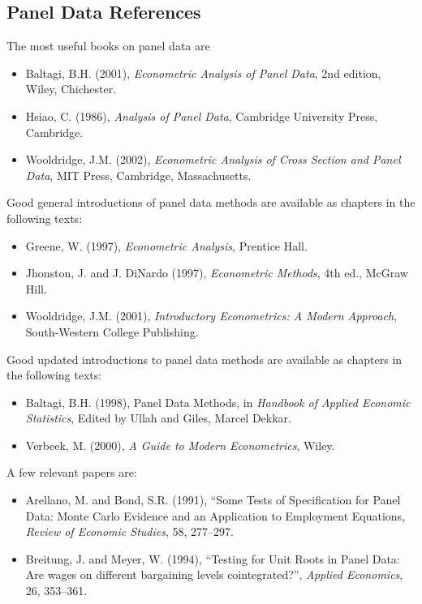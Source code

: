 \documentclass[landscape,letterpaper,9pt]{article}
\begin{document}
\begin{itemize}
\subsection
{Panel Data References}
The most useful books on panel data are

\begin{itemize}
\item Baltagi, B.H. (2001), \textit{Econometric Analysis of Panel Data}, 2nd edition,  Wiley,  Chichester.

\item  Hsiao, C. (1986), \textit{Analysis of Panel Data}, Cambridge University Press, Cambridge.

\item  Wooldridge, J.M. (2002), \textit{Econometric Analysis of Cross Section and Panel Data}, MIT Press, Cambridge, Massachusetts.
\end{itemize}
%
%
Good general  introductions of panel data methods  are available as chapters
in the following texts:
\begin{itemize}
\item  Greene, W. (1997), \textit{Econometric Analysis}, Prentice Hall.

\item  Jhonston, J. and J. DiNardo (1997), \textit{Econometric Methods}, 4th ed., McGraw Hill.

\item  Wooldridge, J.M. (2001), \textit{Introductory Econometrics: A Modern Approach}, South-Western College Publishing.
\end{itemize}

Good updated introductions to panel data methods  are available as chapters
in the following texts:
\begin{itemize}
\item Baltagi, B.H. (1998), Panel Data Methods, in \textit{Handbook of Applied Economic Statistics},
Edited by Ullah and Giles, Marcel Dekkar.
\item  Verbeek, M. (2000),  \textit{A Guide to Modern Econometrics}, Wiley.
\end{itemize}
%
A few relevant papers are:
\begin{itemize}
\item Arellano, M. and Bond, S.R. (1991), ``Some Tests of Specification for Panel Data:
Monte Carlo Evidence and an Application to Employment Equations, \textit{Review of Economic Studies}, 58, 277--297.

\item Breitung, J. and Meyer, W. (1994), ``Testing for Unit Roots in Panel Data: Are wages on different bargaining levels cointegrated?'',
 \textit{Applied Economics}, 26, 353--361.


\end{itemize}
\end{itemize}
\end{document}
